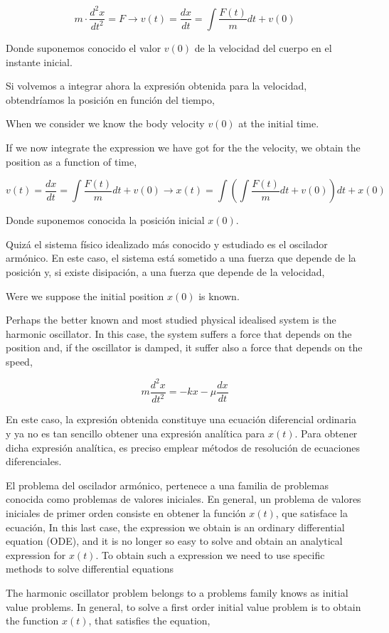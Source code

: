 \begin{equation*}
m\cdot \frac{d^2x}{dt^2}=F \rightarrow v(t)=\frac{dx}{dt}=\int \frac{F(t)}{m}dt +v(0)
\end{equation*}
\begin{paracol}{2}
Donde suponemos conocido el valor $v(0)$ de la velocidad del cuerpo en el instante inicial.

Si volvemos a integrar ahora la expresión obtenida para la velocidad, obtendríamos la posición en función del tiempo,

\switchcolumn
When we consider we know the body velocity $v(0)$ at the initial time.

If we now integrate the expression we have got for the the velocity, we obtain the position as a function of time,
\end{paracol}
\begin{equation*}
v(t)=\frac{dx}{dt}=\int \frac{F(t)}{m}dt +v(0)\rightarrow x(t)=\int\left(\int \frac{F(t)}{m}dt +v(0)\right)dt+x(0)
\end{equation*}
\begin{paracol}{2}
Donde suponemos conocida la posición inicial $x(0)$.

Quizá el sistema físico idealizado más conocido y estudiado es el oscilador armónico. En este caso, el sistema está sometido a una fuerza que depende de la posición y, si existe disipación, a una fuerza que depende de la velocidad,

\switchcolumn
Were we suppose the initial position $x(0)$ is known.

Perhaps the better known and most studied physical idealised system is the harmonic oscillator. In this case, the system suffers a force that depends on the position and, if the oscillator is damped, it suffer also a force that depends on the speed,  

\end{paracol}
\begin{equation*}
m\frac{d^2x}{dt^2}=-kx-\mu \frac{dx}{dt}
\end{equation*}
\begin{paracol}{2}
En este caso, la expresión obtenida constituye una ecuación diferencial ordinaria y ya no es tan sencillo obtener una expresión analítica para $x(t)$. Para obtener dicha expresión analítica, es preciso emplear métodos de resolución de ecuaciones diferenciales.

El problema del oscilador armónico, pertenece a una familia de problemas conocida como problemas de valores iniciales. En general, un problema de valores iniciales de primer orden consiste en obtener la función $x(t)$, que satisface la ecuación,
\switchcolumn
In this last case, the expression we obtain is an ordinary differential equation (ODE), and it is no longer so easy to solve and obtain an analytical expression for $x(t)$. To obtain such a expression we need to use specific methods to solve differential equations

The harmonic oscillator problem belongs to a problems family knows as initial value problems. In general, to solve a first order initial value problem is to obtain the function $x(t)$, that satisfies the equation, 
\end{paracol} 
